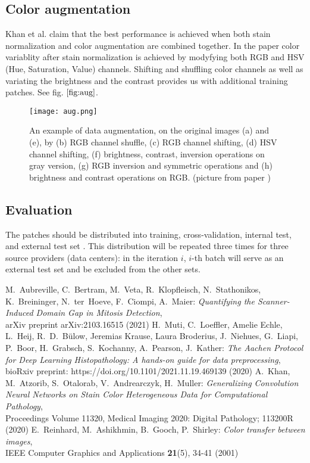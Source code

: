 \documentclass[11pt]{article}
\begin{document}
\subsection{Color augmentation}
Khan et al. \cite{khan} claim that the best performance is achieved when both stain normalization and color augmentation are combined together.
In the paper \cite{khan} color variablity after stain normalization is achieved by modyfying both RGB and HSV (Hue, Saturation, Value) channels.
Shifting and shuffling color channels as well as variating the brightness and the contrast provides us with additional training patches.
See fig. $\ref{fig:aug}$.

\begin{figure}[H]
\centering
\texttt{[image: aug.png]}
				\caption{An example of data augmentation, on the original images (a) and (e), by (b) RGB channel shuffle, (c)
RGB channel shifting, (d) HSV channel shifting, (f) brightness, contrast, inversion operations on gray version,
				(g) RGB inversion and symmetric operations and (h) brightness and contrast operations on RGB. (picture from paper \cite{khan})}			
\label{fig:aug}
\end{figure}


\subsection{Evaluation}
The patches should be distributed into training, cross-validation,
internal test, and external test set \cite{khan}. This distribution will be repeated three times for three source providers (data centers): 
in the iteration $i$, $i$-th batch will serve as an external test set and be excluded from the other sets. 


\begin{thebibliography}{99}
 M.~Aubreville, C.~Bertram, M.~Veta, R.~Klopfleisch, N.~Stathonikos, K.~Breininger, N.~ter~Hoeve, F.~Ciompi, A.~Maier:
\emph{Quantifying the Scanner-Induced Domain Gap in Mitosis Detection},
\\ arXiv preprint arXiv:2103.16515 (2021)
H.~Muti, C.~Loeffler, Amelie Echle, L.~Heij, R.~D.~Bülow, Jeremias Krause, Laura Broderius, J.~Niehues, G.~Liapi, P.~Boor, H.~Grabsch, S.~Kochanny, A.~Pearson, J.~Kather:
\emph{The Aachen Protocol for Deep Learning Histopathology: A hands-on guide for data preprocessing},
\\ bioRxiv preprint: https://doi.org/10.1101/2021.11.19.469139 (2020)
A.~Khan, M.~Atzorib, S.~Otalorab, V.~Andrearczyk, H.~Muller:
\emph{Generalizing Convolution Neural Networks on Stain Color Heterogeneous Data for Computational Pathology},
\\ Proceedings Volume 11320, Medical Imaging 2020: Digital Pathology; 113200R (2020)
E.~Reinhard, M.~Ashikhmin, B.~Gooch, P.~Shirley:
 \emph{Color transfer between images},
\\ IEEE Computer
Graphics and Applications \textbf{21}(5), 34-41 (2001)
\end{thebibliography}
\end{document}
